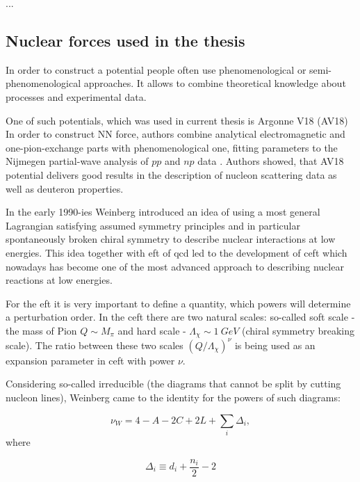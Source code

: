 ...
\subsection*{Nuclear forces used in the thesis}

In order to construct a potential people often use phenomenological
or semi-phenomenological approaches. It allows to combine
theoretical knowledge about processes and experimental data.

One of such potentials, which was used in current thesis is Argonne V18 (AV18) \cite{AV18Wiringa} 
In order to construct NN force, authors combine
analytical electromagnetic and one-pion-exchange parts
with phenomenological one, fitting parameters to
the Nijmegen partial-wave analysis of $pp$ and $np$ data \cite{NijmegenPhysRevC.48.792}. 
Authors showed, that AV18 potential delivers good results
in the description of nucleon scattering data as well as deuteron 
properties. 


In the early 1990-ies Weinberg \cite{WEINBERG1990,WEINBERG1991} introduced 
an idea of using a most general Lagrangian
satisfying assumed symmetry principles and in particular
spontaneously broken chiral symmetry to 
describe nuclear interactions at low energies.
This idea together with \gls*{eft} of \gls*{qcd} 
led to the development of \gls*{ceft}
which nowadays has become one of the most advanced approach to
describing nuclear reactions at low energies.
 
For the \gls*{eft} it is very important to 
define a quantity, which powers will determine a perturbation order.
In the \gls*{ceft} there are two natural scales: so-called soft scale -
the mass of Pion $Q \sim M_\pi$ and hard scale -
$\Lambda_\chi \sim 1~GeV$ (chiral symmetry breaking scale).
The ratio between these two scales $(Q/\Lambda_\chi)^\nu$
is being used as an expansion parameter in  \gls*{ceft} with power
$\nu$.

Considering so-called irreducible (the diagrams that cannot be split
by cutting nucleon lines), Weinberg \cite{WEINBERG1990,WEINBERG1991}
came to the identity for the powers of such diagrams\cite{Machleidt2011}:

\begin{equation}
    \nu_W = 4 - A - 2C + 2L + \sum_i \Delta_i,
    \label{powers}
\end{equation}
where

\begin{equation}
    \Delta_i \equiv d_i + \frac{n_i}{2} - 2
    \label{Delta}
\end{equation}

